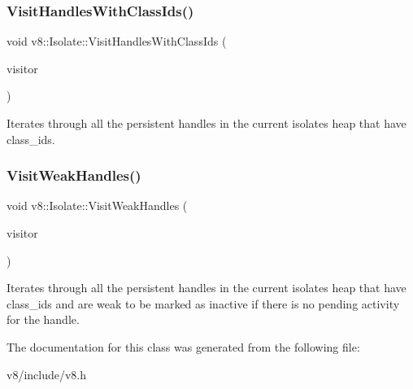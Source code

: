 \subsubsection{\texorpdfstring{Visit\+Handles\+With\+Class\+Ids()}{VisitHandlesWithClassIds()}}
{\footnotesize\ttfamily void v8\+::\+Isolate\+::\+Visit\+Handles\+With\+Class\+Ids (\begin{DoxyParamCaption}\item[{\mbox{\hyperlink{classv8_1_1PersistentHandleVisitor}{Persistent\+Handle\+Visitor}} $\ast$}]{visitor }\end{DoxyParamCaption})}

Iterates through all the persistent handles in the current isolate\textquotesingle{}s heap that have class\+\_\+ids. \mbox{\label{classv8_1_1Isolate_a4f821750a43d17e51778b281ce2c1fcd}} 
\subsubsection{\texorpdfstring{Visit\+Weak\+Handles()}{VisitWeakHandles()}}
{\footnotesize\ttfamily void v8\+::\+Isolate\+::\+Visit\+Weak\+Handles (\begin{DoxyParamCaption}\item[{\mbox{\hyperlink{classv8_1_1PersistentHandleVisitor}{Persistent\+Handle\+Visitor}} $\ast$}]{visitor }\end{DoxyParamCaption})}

Iterates through all the persistent handles in the current isolate\textquotesingle{}s heap that have class\+\_\+ids and are weak to be marked as inactive if there is no pending activity for the handle. 

The documentation for this class was generated from the following file\+:\begin{DoxyCompactItemize}
\item 
v8/include/v8.\+h\end{DoxyCompactItemize}

